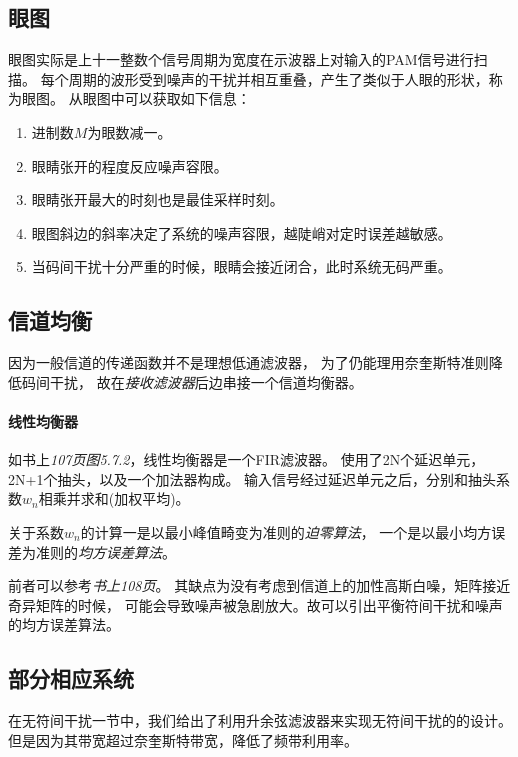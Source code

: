 \subsection{眼图}
    眼图实际是上十一整数个信号周期为宽度在示波器上对输入的PAM信号进行扫描。
    每个周期的波形受到噪声的干扰并相互重叠，产生了类似于人眼的形状，称为眼图。
    从眼图中可以获取如下信息：
    \begin{enumerate}[itemsep=0pt,parsep=0em,label=\color{bupt}\arabic*、,labelsep=0pt,leftmargin=4em]
        \item 进制数$M$为眼数减一。
        \item 眼睛张开的程度反应噪声容限。
        \item 眼睛张开最大的时刻也是最佳采样时刻。
        \item 眼图斜边的斜率决定了系统的噪声容限，越陡峭对定时误差越敏感。
        \item 当码间干扰十分严重的时候，眼睛会接近闭合，此时系统无码严重。
    \end{enumerate}

\subsection{信道均衡}
    因为一般信道的传递函数并不是理想低通滤波器，
    为了仍能理用奈奎斯特准则降低码间干扰，
    故在\emph{接收滤波器}后边串接一个信道均衡器。
    
    \paragraph{线性均衡器}\mbox{}

    如书上\emph{107页图5.7.2}，线性均衡器是一个FIR滤波器。
    使用了2N个延迟单元，2N+1个抽头，以及一个加法器构成。
    输入信号经过延迟单元之后，分别和抽头系数$w_n$相乘并求和(加权平均)。

    关于系数$w_n$的计算一是以最小峰值畸变为准则的\emph{迫零算法}，
    一个是以最小均方误差为准则的\emph{均方误差算法}。

    前者可以参考\emph{书上108页}。
    其缺点为没有考虑到信道上的加性高斯白噪，矩阵接近奇异矩阵的时候，
    可能会导致噪声被急剧放大。故可以引出平衡符间干扰和噪声的均方误差算法。

\subsection{部分相应系统}
    在无符间干扰一节中，我们给出了利用升余弦滤波器来实现无符间干扰的的设计。
    但是因为其带宽超过奈奎斯特带宽，降低了频带利用率。

